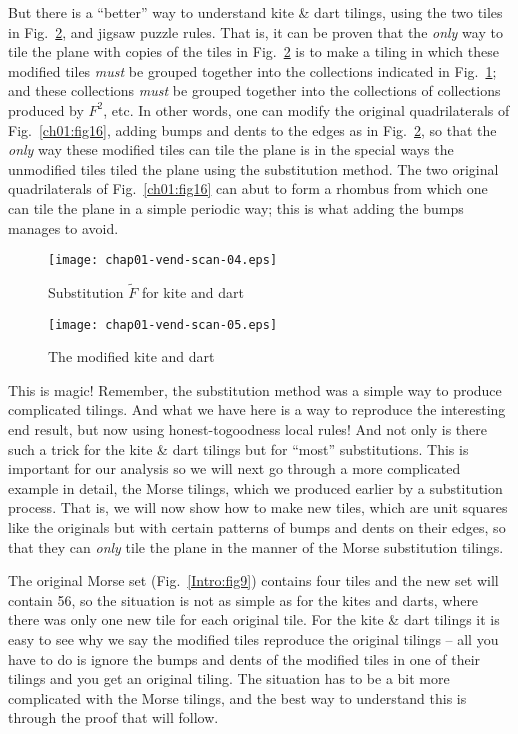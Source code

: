 \documentclass[reqno]{stml-l}
\theoremstyle{plain}
\theoremstyle{definition}
\numberwithin{equation}{chapter}
\begin{document}
But there is a ``better'' way to understand kite \& dart tilings, using the two tiles in Fig.~\ref{ch01:fig18}, and jigsaw puzzle rules. That is, it can be proven \cite{bib:Gar} that the \emph{only} way to tile the plane with copies of the tiles in Fig.~\ref{ch01:fig18} is to make a tiling in which these modified tiles \emph{must} be grouped together into the collections indicated in Fig.~\ref{ch01:fig17};
and these collections \emph{must} be grouped together into the collections of collections produced by $F^{2}$, etc. In other words, one can modify
the original quadrilaterals of Fig.~\ref{ch01:fig16}, adding bumps and dents to the edges as in Fig.~\ref{ch01:fig18}, so that the \emph{only} way these modified tiles can tile the plane is in the special ways the unmodified tiles tiled the plane using the substitution method. The two original quadrilaterals of Fig.~\ref{ch01:fig16} can abut to form a rhombus from which one can tile the plane in a simple periodic way; this is what adding the bumps manages to avoid.
\begin{figure}[h]
\texttt{[image: chap01-vend-scan-04.eps]}
\caption{Substitution $\tilde{F}$ for kite and
dart}
\label{ch01:fig17}
\end{figure}

\begin{figure}[h]
\texttt{[image: chap01-vend-scan-05.eps]}
\caption{The modified kite and dart }
\label{ch01:fig18}
\end{figure}

This is magic! Remember, the substitution method was a simple way to produce complicated tilings. And what we have here is a way to reproduce the interesting end result, but now using honest-togoodness local rules! And not only is there such a trick for the kite \& dart tilings but for ``most'' substitutions. This is important for our analysis so we will next go through a more complicated example in detail, the Morse tilings, which we produced earlier by a substitution process. That is, we will now show how to make new tiles, which are unit squares like the originals but with certain patterns of bumps and dents on their edges, so that they can \emph{only} tile the plane in the manner of the Morse substitution tilings.

The original Morse set (Fig.~\ref{Intro:fig9}) contains four tiles and the new set will contain 56, so the situation is not as simple as for the kites and darts, where there was only one new tile for each original tile. For the kite \& dart tilings it is easy to see why we say the modified tiles reproduce the original tilings -- all you have to do is ignore the bumps and dents of the modified tiles in one of their tilings and you get an original tiling. The situation has to be a bit more complicated with the Morse tilings, and the best way to understand this is through the proof that will follow.
\end{document}
